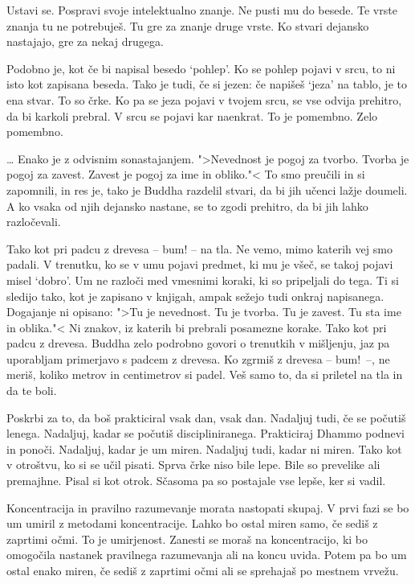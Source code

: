 
Ustavi se. Pospravi svoje intelektualno znanje. Ne pusti mu do besede. Te vrste znanja tu ne potrebuješ. Tu gre za znanje druge vrste. Ko stvari dejansko nastajajo, gre za nekaj drugega.

Podobno je, kot če bi napisal besedo `pohlep'. Ko se pohlep pojavi v srcu, to ni isto kot zapisana beseda. Tako je tudi, če si jezen: če napišeš `jeza' na tablo, je to ena stvar. To so črke. Ko pa se jeza pojavi v tvojem srcu, se vse odvija prehitro, da bi karkoli prebral. V srcu se pojavi kar naenkrat. To je pomembno. Zelo pomembno.

\clearpage


\ldots{} Enako je z odvisnim sonastajanjem. ">Nevednost je pogoj za tvorbo. Tvorba je pogoj za zavest. Zavest je pogoj za ime in obliko."< To smo preučili in si zapomnili, in res je, tako je Buddha razdelil stvari, da bi jih učenci lažje doumeli. A ko vsaka od njih dejansko nastane, se to zgodi prehitro, da bi jih lahko razločevali.

Tako kot pri padcu z drevesa – bum! – na tla. Ne vemo, mimo katerih vej smo padali. V trenutku, ko se v umu pojavi predmet, ki mu je všeč, se takoj pojavi misel `dobro'. Um ne razloči med vmesnimi koraki, ki so pripeljali do tega. Ti si sledijo tako, kot je zapisano v knjigah, ampak sežejo tudi onkraj napisanega. Dogajanje ni opisano: ">Tu je nevednost. Tu je tvorba. Tu je zavest. Tu sta ime in oblika."< Ni znakov, iz katerih bi prebrali posamezne korake. Tako kot pri padcu z drevesa. Buddha zelo podrobno govori o trenutkih v mišljenju, jaz pa uporabljam primerjavo s padcem z drevesa. Ko zgrmiš z drevesa – bum! –, ne meriš, koliko metrov in centimetrov si padel. Veš samo to, da si priletel na tla in da te boli.

\clearpage


Poskrbi za to, da boš prakticiral vsak dan, vsak dan. Nadaljuj tudi, če se počutiš lenega. Nadaljuj, kadar se počutiš discipliniranega. Prakticiraj Dhammo podnevi in ponoči. Nadaljuj, kadar je um miren. Nadaljuj tudi, kadar ni miren. Tako kot v otroštvu, ko si se učil pisati. Sprva črke niso bile lepe. Bile so prevelike ali premajhne. Pisal si kot otrok. Sčasoma pa so postajale vse lepše, ker si vadil.


Koncentracija in pravilno razumevanje morata nastopati skupaj. V prvi fazi se bo um umiril z metodami koncentracije. Lahko bo ostal miren samo, če sediš z zaprtimi očmi. To je umirjenost. Zanesti se moraš na koncentracijo, ki bo omogočila nastanek pravilnega razumevanja ali na koncu uvida. Potem pa bo um ostal enako miren, če sediš z zaprtimi očmi ali se sprehajaš po mestnem vrvežu.

